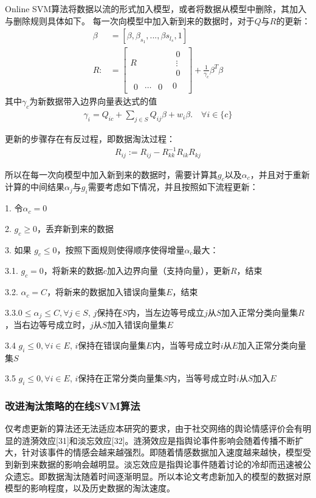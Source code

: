\documentclass[UTF8]{csoarticle}
\begin{document}
Online SVM算法将数据以流的形式加入模型，或者将数据从模型中删除，其加入与删除规则具体如下。
每一次向模型中加入新到来的数据时，对于$Q$与$R$的更新：
\begin{align}\label{eq:update}
\beta &=[\beta,\beta_{s_1},...,\beta{s_{l_s}},1]\\
R:&=\begin{bmatrix}
R& \begin{matrix}0\\ \vdots\\0 \end{matrix}\\
\begin{matrix}0&\cdots&0\end{matrix}&0
\end{bmatrix}+\frac{1}{\gamma_c}\beta^T\beta
\end{align}
其中$\gamma_c$为新数据带入边界向量表达式的值
\begin{align}\label{eq:gammac}
\gamma_i = Q_{ic} + \sum_{j\in S} {Q_{ij}\beta} + w_i\beta.\quad \forall i \in \{c\}
\end{align}

更新的步骤存在有反过程，即数据淘汰过程：
\begin{align}\label{eq:elimination}
R_{ij}:=R_{ij}-R_{kk}^{-1} R_{ik} R_{kj}
\end{align}

所以在每一次向模型中加入新到来的数据时，需要计算其$g_c$以及$\alpha_c$，并且对于重新计算的中间结果$\alpha_j$与$g_i$需要考虑如下情况，并且按照如下流程更新：

1. 令$\alpha_c=0$

2. $g_c\ge0$，丢弃新到来的数据

3. 如果 $g_c\leq 0$，按照下面规则使得顺序使得增量$\alpha_c$最大：

3.1. $g_c=0$，将新来的数据$c$加入边界向量（支持向量），更新$R$，结束

3.2. $\alpha_c=C$，将新来的数据加入错误向量集$E$，结束

3.3.$0\leq \alpha_j \leq C,\forall j\in S$, $j$保持在$S$内，当左边等号成立$j$从$S$加入正常分类向量集$R$，当右边等号成立时，$j$从$S$加入错误向量集$E$

3.4 $g_i\leq 0,\forall i\in E$, $i$保持在错误向量集$E$内，当等号成立时$i$从$E$加入正常分类向量集$S$

3.5 $g_i\leq 0,\forall i\in E$, $i$保持在正常分类向量集$S$内，当等号成立时$i$从$S$加入$E$

\subsubsection{改进淘汰策略的在线SVM算法}
仅考虑更新的算法还无法适应本研究的要求，由于社交网络的舆论情感评价会有明显的涟漪效应[31]和淡忘效应[32]。涟漪效应是指舆论事件影响会随着传播不断扩大，针对该事件的情感会越来越强烈。即随着情感数据加入速度越来越快，模型受到新到来数据的影响会越明显。淡忘效应是指舆论事件随着讨论的冷却而迅速被公众遗忘。即数据淘汰随着时间逐渐明显。所以本论文考虑新加入的模型的数据对原模型的影响程度，以及历史数据的淘汰速度。
\end{document}
